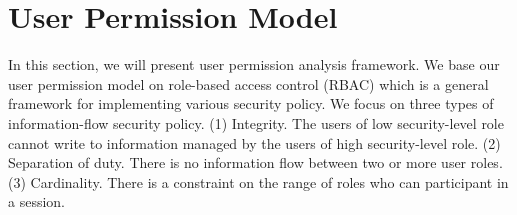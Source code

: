 \section{User Permission Model}
\label{sec:preliminary}
In this section, we will present user permission analysis framework.
We base our user permission model on role-based access control (RBAC) which is a general framework for implementing various security policy.
We focus on three types of information-flow security policy.
(1) Integrity.
The users of low security-level role cannot write to information managed by the users of high security-level role.
(2) Separation of duty. 
There is no information flow between two or more user roles.
(3) Cardinality. 
There is a constraint on the range of roles who can participant in a session.
%
%
%
%
%
